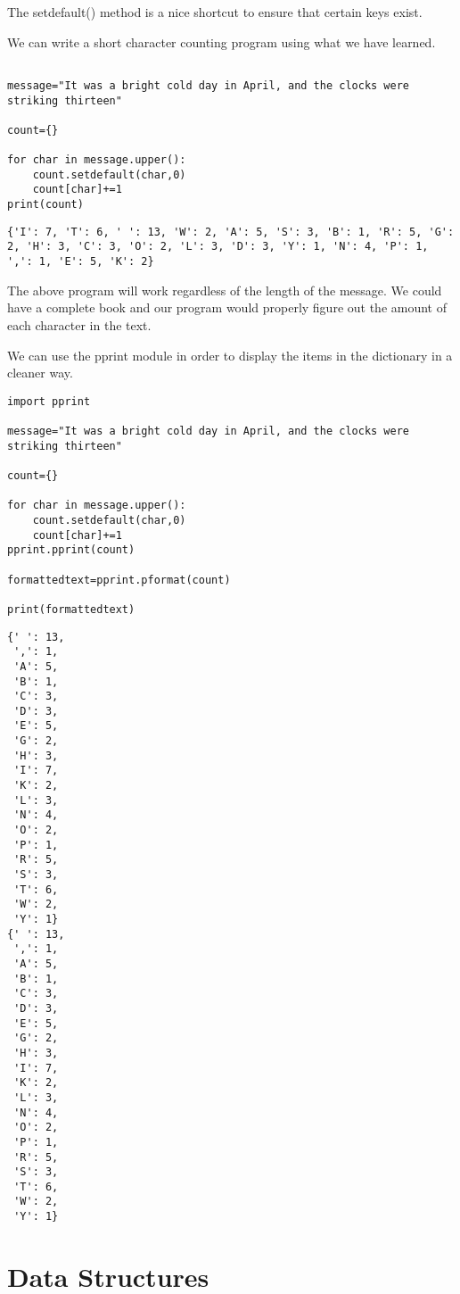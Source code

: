\documentclass[11pt]{article}
\begin{document}
The setdefault() method is a nice shortcut to ensure that certain keys exist.


We can write a short character counting program using what we have learned.


\begin{verbatim}

message="It was a bright cold day in April, and the clocks were striking thirteen"

count={}

for char in message.upper():
    count.setdefault(char,0)
    count[char]+=1
print(count)

\end{verbatim}

\begin{verbatim}
{'I': 7, 'T': 6, ' ': 13, 'W': 2, 'A': 5, 'S': 3, 'B': 1, 'R': 5, 'G': 2, 'H': 3, 'C': 3, 'O': 2, 'L': 3, 'D': 3, 'Y': 1, 'N': 4, 'P': 1, ',': 1, 'E': 5, 'K': 2}
\end{verbatim}


The above program will work regardless of the length of the message. We could have a complete book and our program would properly figure out the amount of each character in the text.

We can use the pprint module in order to display the items in the dictionary in a cleaner way.

\begin{verbatim}
import pprint

message="It was a bright cold day in April, and the clocks were striking thirteen"

count={}

for char in message.upper():
    count.setdefault(char,0)
    count[char]+=1
pprint.pprint(count)

formattedtext=pprint.pformat(count)

print(formattedtext)

\end{verbatim}

\begin{verbatim}
{' ': 13,
 ',': 1,
 'A': 5,
 'B': 1,
 'C': 3,
 'D': 3,
 'E': 5,
 'G': 2,
 'H': 3,
 'I': 7,
 'K': 2,
 'L': 3,
 'N': 4,
 'O': 2,
 'P': 1,
 'R': 5,
 'S': 3,
 'T': 6,
 'W': 2,
 'Y': 1}
{' ': 13,
 ',': 1,
 'A': 5,
 'B': 1,
 'C': 3,
 'D': 3,
 'E': 5,
 'G': 2,
 'H': 3,
 'I': 7,
 'K': 2,
 'L': 3,
 'N': 4,
 'O': 2,
 'P': 1,
 'R': 5,
 'S': 3,
 'T': 6,
 'W': 2,
 'Y': 1}
\end{verbatim}

\section{Data Structures}
\label{sec:org2e32b25}
\end{document}
